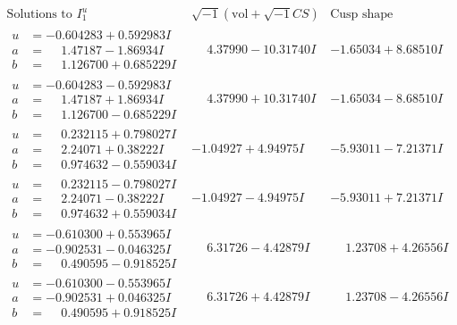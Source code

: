 \documentclass[1p]{elsarticle_modified}
\theoremstyle{definition}
\newcommand{\I}{\sqrt{-1}}
\begin{document}
$$\begin{array}{c|c|c}  
\text{Solutions to }I^u_{1}& \I (\text{vol} + \sqrt{-1}CS) & \text{Cusp shape}\\
 \hline 
\begin{aligned}
u &= -0.604283 + 0.592983 I \\
a &= \phantom{-}1.47187 - 1.86934 I \\
b &= \phantom{-}1.126700 + 0.685229 I\end{aligned}
 & \phantom{-}4.37990 - 10.31740 I & -1.65034 + 8.68510 I \\ \hline\begin{aligned}
u &= -0.604283 - 0.592983 I \\
a &= \phantom{-}1.47187 + 1.86934 I \\
b &= \phantom{-}1.126700 - 0.685229 I\end{aligned}
 & \phantom{-}4.37990 + 10.31740 I & -1.65034 - 8.68510 I \\ \hline\begin{aligned}
u &= \phantom{-}0.232115 + 0.798027 I \\
a &= \phantom{-}2.24071 + 0.38222 I \\
b &= \phantom{-}0.974632 - 0.559034 I\end{aligned}
 & -1.04927 + 4.94975 I & -5.93011 - 7.21371 I \\ \hline\begin{aligned}
u &= \phantom{-}0.232115 - 0.798027 I \\
a &= \phantom{-}2.24071 - 0.38222 I \\
b &= \phantom{-}0.974632 + 0.559034 I\end{aligned}
 & -1.04927 - 4.94975 I & -5.93011 + 7.21371 I \\ \hline\begin{aligned}
u &= -0.610300 + 0.553965 I \\
a &= -0.902531 - 0.046325 I \\
b &= \phantom{-}0.490595 - 0.918525 I\end{aligned}
 & \phantom{-}6.31726 - 4.42879 I & \phantom{-}1.23708 + 4.26556 I \\ \hline\begin{aligned}
u &= -0.610300 - 0.553965 I \\
a &= -0.902531 + 0.046325 I \\
b &= \phantom{-}0.490595 + 0.918525 I\end{aligned}
 & \phantom{-}6.31726 + 4.42879 I & \phantom{-}1.23708 - 4.26556 I \\ \hline\begin{aligned}

\end{aligned}
\end{array}$$
\end{document}
